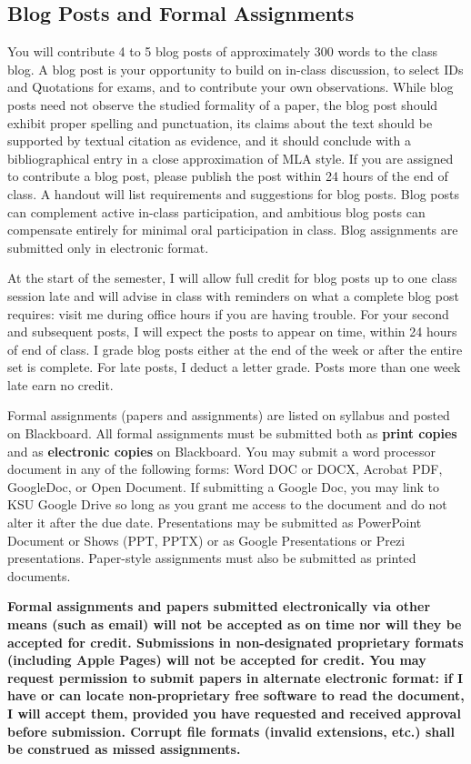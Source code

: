 \documentclass[]{article}
\begin{document}
\subsection{Blog Posts and Formal
Assignments}\label{blog-posts-and-formal-assignments}

You will contribute 4 to 5 blog posts of approximately 300 words to the
class blog. A blog post is your opportunity to build on in-class
discussion, to select IDs and Quotations for exams, and to contribute
your own observations. While blog posts need not observe the studied
formality of a paper, the blog post should exhibit proper spelling and
punctuation, its claims about the text should be supported by textual
citation as evidence, and it should conclude with a bibliographical
entry in a close approximation of MLA style. If you are assigned to
contribute a blog post, please publish the post within 24 hours of the
end of class. A handout will list requirements and suggestions for blog
posts. Blog posts can complement active in-class participation, and
ambitious blog posts can compensate entirely for minimal oral
participation in class. Blog assignments are submitted only in
electronic format.

At the start of the semester, I will allow full credit for blog posts up
to one class session late and will advise in class with reminders on
what a complete blog post requires: visit me during office hours if you
are having trouble. For your second and subsequent posts, I will expect
the posts to appear on time, within 24 hours of end of class. I grade
blog posts either at the end of the week or after the entire set is
complete. For late posts, I deduct a letter grade. Posts more than one
week late earn no credit.

Formal assignments (papers and assignments) are listed on syllabus and
posted on Blackboard. All formal assignments must be submitted both as
\textbf{print copies} and as \textbf{electronic copies} on Blackboard.
You may submit a word processor document in any of the following forms:
Word DOC or DOCX, Acrobat PDF, GoogleDoc, or Open Document. If
submitting a Google Doc, you may link to KSU Google Drive so long as you
grant me access to the document and do not alter it after the due date.
Presentations may be submitted as PowerPoint Document or Shows (PPT,
PPTX) or as Google Presentations or Prezi presentations. Paper-style
assignments must also be submitted as printed documents.

\textbf{Formal assignments and papers submitted electronically via other
means (such as email) will not be accepted as on time nor will they be
accepted for credit. Submissions in non-designated proprietary formats
(including Apple Pages) will not be accepted for credit. You may request
permission to submit papers in alternate electronic format: if I have or
can locate non-proprietary free software to read the document, I will
accept them, provided you have requested and received approval before
submission. Corrupt file formats (invalid extensions, etc.) shall be
construed as missed assignments. }
\end{document}

